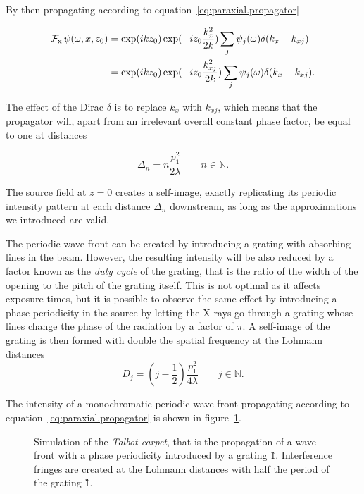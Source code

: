 By then propagating according to equation~\eqref{eq:paraxial.propagator}

\begin{align}
    \operatorname{\mathcal{F}_{x}}\psi(\omega, x, z_0) &= \exp(ikz_0)\exp(-i z_0\frac{k_x^2}{2k})\sum_j \psi_j(\omega)\delta(k_x -
    k_{xj}) \\
    &= \exp(ikz_0)\exp(-i z_0\frac{k_{xj}^2}{2k})\sum_j \psi_j(\omega)\delta(k_x -
    k_{xj}).
    \label{eq:talbot1}
\end{align}

The effect of the Dirac $\delta$ is to replace $k_x$ with $k_{xj}$, which
means that the propagator will, apart from an irrelevant overall constant phase
factor, be equal to one at distances

\begin{equation}
    \Delta_n = n \frac{p_1^2}{2 \lambda} \qquad n \in
    \mathbb{N}.\label{eq:talbot.distance}
\end{equation}

The source field at $z = 0$ creates a
self-image, exactly replicating its periodic intensity pattern at each
distance $\Delta_n$ downstream, as long as the approximations we introduced
are valid.

The periodic wave front can be created by introducing a grating with absorbing lines in
the beam. However, the resulting intensity will be also reduced by a factor
known as the \emph{duty cycle} of the grating, that is the ratio of the
width of the opening to the pitch of the grating itself. This is not optimal
as it affects exposure times, but it is possible to observe the same effect
by introducing a phase periodicity in the source by letting the X-rays
go through a grating whose lines change the phase of the radiation by a
factor of $\pi$. A self-image of the grating is then formed with double the
spatial frequency at the Lohmann distances~\cite{Lohmann1971}
\begin{equation}
    D_j = \left(j - \frac{1}{2}\right) \frac{p_1^2}{4 \lambda} \qquad
    j\in\mathbb{N}.\label{eq:lohmann-distance}
\end{equation}

The intensity of a monochromatic periodic wave front propagating according to
equation~\eqref{eq:paraxial.propagator} is shown in
figure~\ref{fig:talbotcarpet}.

\begin{figure}[htb]
    \centering
    
    \caption[Talbot carpet.]{Simulation of the \emph{Talbot carpet},
    that is the propagation of a wave front with a phase periodicity
    introduced by a grating \G1.
    Interference fringes are created at the Lohmann distances with half the
period of the grating \G1.}
    \label{fig:talbotcarpet}
\end{figure}

